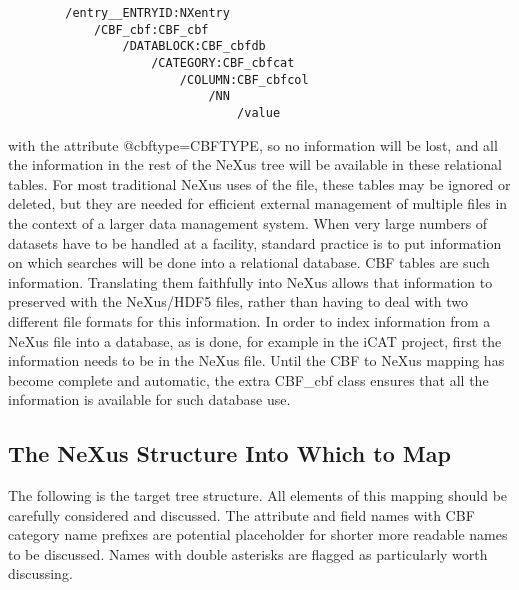 \documentclass[11pt]{article}
\begin{document}
\begin{verbatim}
        /entry__ENTRYID:NXentry 
            /CBF_cbf:CBF_cbf 
                /DATABLOCK:CBF_cbfdb 
                    /CATEGORY:CBF_cbfcat 
                        /COLUMN:CBF_cbfcol 
                            /NN 
                                /value
\end{verbatim}%

\noindent{}with the attribute @cbftype=CBFTYPE, so no information will be lost, and all the
information in the rest of the NeXus tree will be available in these relational tables.  For
most traditional NeXus uses of the file, these tables may be ignored or deleted, but they
are needed for efficient external management of multiple files in the context of a
larger data management system.  When very large numbers of datasets have to be handled
at a facility, standard practice is to put information on which searches will be
done into a relational database.  CBF tables are such information.  Translating them
faithfully into NeXus allows that information to preserved with the NeXus/HDF5 files,
rather than having to deal with two different file formats for this information.
In order to index information from a NeXus file into a database, as is done,
for example in the iCAT project, first the information needs to be in the
NeXus file.  Until the CBF to NeXus mapping has become complete and automatic,
the extra CBF\_cbf class ensures that all the information is available for such
database use.

\subsection{The NeXus Structure Into Which to Map}
\label{The NeXus Structure Into Which to Map}


The following is the target tree structure. All elements of this mapping 
should be carefully considered and discussed.   The attribute and field
names with CBF category name prefixes are potential placeholder for
shorter more readable names to be discussed.  Names with double asterisks
are flagged as particularly worth discussing.
\end{document}
